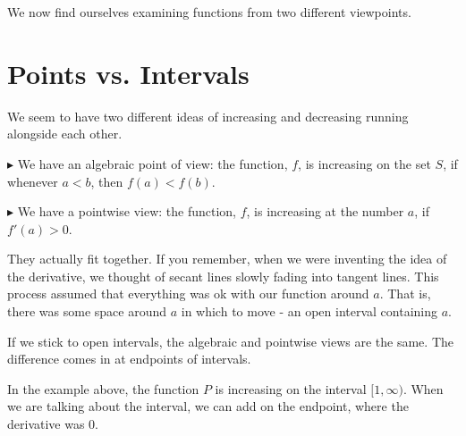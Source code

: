 \documentclass{ximera}
\begin{document}
\begin{example}
\end{example}

We now find ourselves examining functions from two different viewpoints. 



\section*{ Points vs. Intervals}




We seem to have two different ideas of increasing and decreasing running alongside each other. 



\textbf{\textcolor{red!70!darkgray}{$\blacktriangleright$}} We have an algebraic point of view: the function, $f$, is increasing on the set $S$, if whenever $a < b$, then $f(a) < f(b)$.



\textbf{\textcolor{red!70!darkgray}{$\blacktriangleright$}} We have a pointwise view: the function, $f$, is increasing at the number $a$, if $f'(a) > 0$. 



They actually fit together. If you remember, when we were inventing the idea of the derivative, we thought of secant lines slowly fading into tangent lines.  This process assumed that everything was ok with our function around $a$.  That is, there was some space around $a$ in which to move - an open interval containing $a$.

If we stick to open intervals, the algebraic and pointwise views are the same.  The difference comes in at endpoints of intervals. 


In the example above, the function $P$ is increasing on the interval $[1, \infty)$.  When we are talking about the interval, we can add on the endpoint, where the derivative was $0$.
\end{document}
